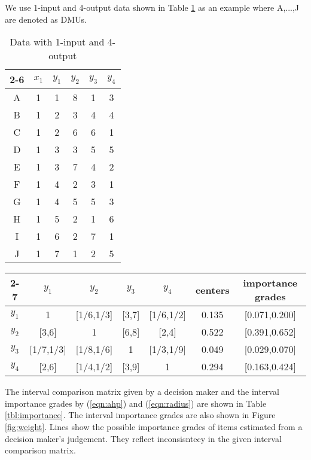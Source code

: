 We use 1-input and 4-output data shown in Table \ref{tbl:data1} as an example where A,...,J are denoted as DMUs. 
\begin{table}[t]
\begin{center}
\begin{tabular}{|c|c|c|c|c|c|} \cline{2-6}
\multicolumn{1}{c|}{} & $x_1$ & $y_1$ & $y_2$ & $y_3$ & $y_4$ \\\hline
A & 1 & 1 & 8 & 1 & 3 \\\hline
B & 1 & 2 & 3 & 4 & 4 \\\hline
C & 1 & 2 & 6 & 6 & 1 \\\hline
D & 1 & 3 & 3 & 5 & 5 \\\hline
E & 1 & 3 & 7 & 4 & 2 \\\hline
F & 1 & 4 & 2 & 3 & 1 \\\hline
G & 1 & 4 & 5 & 5 & 3 \\\hline
H & 1 & 5 & 2 & 1 & 6 \\\hline
I & 1 & 6 & 2 & 7 & 1 \\\hline
J & 1 & 7 & 1 & 2 & 5 \\\hline
\end{tabular}
\end{center}
\caption{Data with 1-input and 4-output}
\label{tbl:data1}
\end{table}
\begin{table*}[t]
\begin{center}
\begin{tabular}{|c|c|c|c|c||c|c|} \cline{2-7}
\multicolumn{1}{c|}{} & $y_1$ & $y_2$ & $y_3$ & $y_4$ & centers& importance grades\\\hline
$y_1$ & 1  & [1/6,1/3] & [3,7] & [1/6,1/2] & 0.135 & [0.071,0.200] \\\hline
$y_2$ & [3,6] & 1 & [6,8] & [2,4] & 0.522 & [0.391,0.652] \\\hline
$y_3$ & [1/7,1/3] & [1/8,1/6]& 1 & [1/3,1/9] & 0.049 & [0.029,0.070] \\\hline
$y_4$ & [2,6] & [1/4,1/2] & [3,9] & 1 & 0.294 & [0.163,0.424] \\\hline
\end{tabular}
\end{center}
\caption{Comparison matrix and importance grades of the output item}
\label{tbl:importance}
\end{table*}

The interval comparison matrix given by a decision maker and the interval importance grades by (\ref{eqn:ahp}) and (\ref{eqn:radius}) are shown in Table \ref{tbl:importance}. 
The interval importance grades are also shown in Figure \ref{fig:weight}. 
Lines show the possible importance grades of items estimated from a decision maker's judgement. 
They reflect inconsisntecy in the given interval comparison matrix. 

